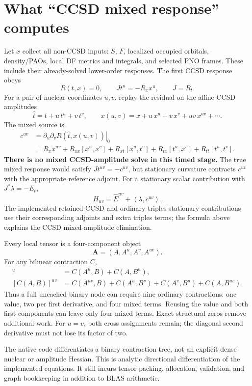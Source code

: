 \documentclass[10pt,letterpaper]{article}
\newcommand{\uv}{^{uv}}
\newcommand{\ip}[2]{\left\langle #1,#2\right\rangle}
\newcommand{\sectionpage}[1]{\newpage\section{#1}}
\begin{document}
\sectionpage{What ``CCSD mixed response'' computes}
Let $x$ collect all non-CCSD inputs: $S$, $F$, localized occupied orbitals, density/PAOs, local DF metrics and integrals, and selected PNO frames. These include their already-solved lower-order responses. The first CCSD response obeys
\begin{equation}
R(t,x)=0,\qquad Jt^u=-R_xx^u,\qquad J=R_t.
\end{equation}
For a pair of nuclear coordinates $u,v$, replay the residual on the affine CCSD amplitudes
\begin{equation}
\widehat t=t+u\,t^u+v\,t^v,\qquad
x(u,v)=x+u\,x^u+v\,x^v+uv\,x\uv+\cdots.
\end{equation}
The mixed source is
\begin{align}
c\uv&=\left.\partial_u\partial_vR(\widehat t,x(u,v))\right|_0\\
&=R_xx\uv+R_{xx}[x^u,x^v]
 +R_{xt}[x^u,t^v]+R_{tx}[t^u,x^v]+R_{tt}[t^u,t^v].
\end{align}
\textbf{There is no mixed CCSD-amplitude solve in this timed stage.} The true mixed response would satisfy $Jt\uv=-c\uv$, but stationary curvature contracts $c\uv$ with the appropriate reference adjoint. For a stationary scalar contribution with $J^{\!*}\lambda=-E_t$,
\begin{equation}
H_{uv}=\widehat E\uv+\ip{\lambda}{c\uv}.
\end{equation}
The implemented retained-CCSD and ordinary-triples stationary contributions use their corresponding adjoints and extra triples terms; the formula above explains the CCSD mixed-amplitude elimination.

Every local tensor is a four-component object
\begin{equation}
\mathbf A=(A,A^u,A^v,A\uv).
\end{equation}
For any bilinear contraction $C$,
\begin{align}
[C(A,B)]^u&=C(A^u,B)+C(A,B^u),\\
[C(A,B)]\uv&=C(A\uv,B)+C(A^u,B^v)+C(A^v,B^u)+C(A,B\uv).
\end{align}
Thus a full uncached binary node can require nine ordinary contractions: one value, two per first derivative, and four mixed terms. Reusing the value and both first components can leave only four mixed terms. Exact structural zeros remove additional work. For $u=v$, both cross assignments remain; the diagonal second derivative must not lose its factor of two.

The native code differentiates a binary contraction tree, not an explicit dense nuclear or amplitude Hessian. This is analytic directional differentiation of the implemented equations. It still incurs tensor packing, allocation, validation, and graph bookkeeping in addition to BLAS arithmetic.
\end{document}
